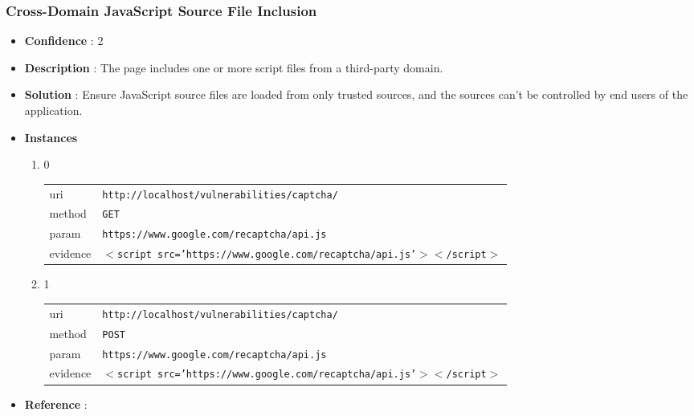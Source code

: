 \documentclass[10pt]{article}
\begin{document}
\subsubsection{Cross-Domain JavaScript Source File Inclusion}
\begin{itemize}
\item[] \textbf{Confidence} : 2
\item[] \textbf{Description} : The page includes one or more script files from a third-party domain.
\item[] \textbf{Solution} :  Ensure JavaScript source files are loaded from only trusted sources, and the sources can't be controlled by end users of the application.
\item[] \textbf{Instances}
\begin{enumerate}
\item[] 0
\begin{tabular}{| l | p{12cm}}
uri & \texttt{http://localhost/vulnerabilities/captcha/} \\
method & \texttt{GET} \\
param & \texttt{https://www.google.com/recaptcha/api.js} \\
evidence & \texttt{$<$script src='https://www.google.com/recaptcha/api.js'$>$$<$/script$>$} \\
\end{tabular}
\item[] 1
\begin{tabular}{| l | p{12cm}}
uri & \texttt{http://localhost/vulnerabilities/captcha/} \\
method & \texttt{POST} \\
param & \texttt{https://www.google.com/recaptcha/api.js} \\
evidence & \texttt{$<$script src='https://www.google.com/recaptcha/api.js'$>$$<$/script$>$} \\
\end{tabular}
\end{enumerate}
\item[] \textbf{Reference} : 
\end{itemize}
\end{document}

